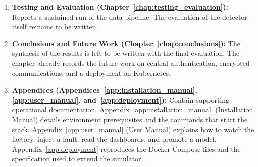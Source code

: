\begin{enumerate}
    \item \textbf{Testing and Evaluation (Chapter~\ref{chap:testing_evaluation}):} Reports a sustained run of the data pipeline. The evaluation of the detector itself remains to be written.
    
    \item \textbf{Conclusions and Future Work (Chapter~\ref{chap:conclusions}):} The synthesis of the results is left to be written with the final evaluation. The chapter already records the future work on central authentication, encrypted communications, and a deployment on Kubernetes.
    
    \item \textbf{Appendices (Appendices~\ref{app:installation_manual}, \ref{app:user_manual}, and~\ref{app:deployment}):} Contain supporting operational documentation. Appendix~\ref{app:installation_manual} (Installation Manual) details environment prerequisites and the commands that start the stack. Appendix~\ref{app:user_manual} (User Manual) explains how to watch the factory, inject a fault, read the dashboards, and promote a model. Appendix~\ref{app:deployment} reproduces the Docker Compose files and the specification used to extend the simulator.
\end{enumerate}